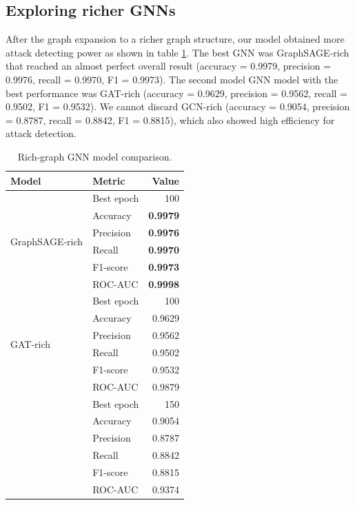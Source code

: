 \documentclass[final,5p,times,twocolumn]{elsarticle}
\begin{document}
\subsection{Exploring richer GNNs}
\label{Exploring richer GNNs}
After the graph expansion to a richer graph structure, our model obtained more attack detecting power as shown in table \ref{tab:rich_gnn_performance_vertical}. The best GNN was GraphSAGE-rich that reached an almost perfect overall result (accuracy = 0.9979, precision = 0.9976, recall = 0.9970, F1 = 0.9973). The second model GNN model with the best performance was GAT-rich (accuracy = 0.9629, precision = 0.9562, recall = 0.9502, F1 = 0.9532). {\color{red}We cannot discard GCN-rich (accuracy = 0.9054, precision = 0.8787, recall = 0.8842, F1 = 0.8815), which also showed high efficiency for attack detection.}


\begin{table}[H]
\caption{Rich-graph GNN model comparison.}
\centering
\scriptsize
\renewcommand{\arraystretch}{1.15}
\begin{tabular}{llr}
\toprule
\textbf{Model} & \textbf{Metric} & \textbf{Value} \\
\midrule

\multirow{6}{*}{GraphSAGE-rich}
& Best epoch & 100 \\
& Accuracy & \textbf{0.9979} \\
& Precision & \textbf{0.9976} \\
& Recall & \textbf{0.9970} \\
& F1-score & \textbf{0.9973} \\
& ROC-AUC & \textbf{0.9998} \\
\midrule

\multirow{6}{*}{GAT-rich}
& Best epoch & 100 \\
& Accuracy & 0.9629 \\
& Precision & 0.9562 \\
& Recall & 0.9502 \\
& F1-score & 0.9532 \\
& ROC-AUC & 0.9879 \\
\midrule

\color{red}\multirow{6}{*}{GCN-rich}
& \color{red}Best epoch & \color{red}150 \\
& \color{red}Accuracy & \color{red}0.9054 \\
& \color{red}Precision & \color{red}0.8787 \\
& \color{red}Recall & \color{red}0.8842 \\
& \color{red}F1-score & \color{red}0.8815 \\
& \color{red}ROC-AUC & \color{red}0.9374 \\
\bottomrule
\end{tabular}
\label{tab:rich_gnn_performance_vertical}
\end{table}
\end{document}
